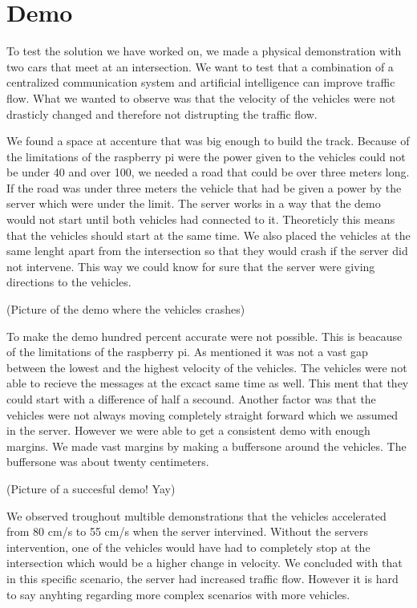 \section{Demo}
To test the solution we have worked on, we made a physical demonstration with two cars that meet at an intersection. We want to test that a combination of a centralized communication system and artificial intelligence can improve traffic flow. What we wanted to observe was that the velocity of the vehicles were not drasticly changed and therefore not distrupting the traffic flow.

We found a space at accenture that was big enough to build the track. Because of the limitations of the raspberry pi were the power given to the vehicles could not be under 40 and over 100, we needed a road that could be over three meters long. If the road was under three meters the vehicle that had be given a power by the server which were under the limit. The server works in a way that the demo would not start until both vehicles had connected to it. Theoreticly this means that the vehicles should start at the same time. We also placed the vehicles at the same lenght apart from the intersection so that they would crash if the server did not intervene. This way we could know for sure that the server were giving directions to the vehicles. 

(Picture of the demo where the vehicles crashes)

To make the demo hundred percent accurate were not possible. This is beacause of the limitations of the raspberry pi. As mentioned it was not a vast gap between the lowest and the highest velocity of the vehicles. The vehicles were not able to recieve the messages at the excact same time as well. This ment that they could start with a difference of half a secound. Another factor was that the vehicles were not always moving completely straight forward which we assumed in the server. However we were able to get a consistent demo with enough margins. We made  vast margins by making a buffersone around the vehicles. The buffersone was about twenty centimeters.

(Picture of a succesful demo! Yay)

We observed troughout multible demonstrations that the vehicles accelerated from 80 cm/s to 55 cm/s when the server intervined. Without the servers intervention, one of the vehicles would have had to completely stop at the intersection which would be a higher change in velocity. We concluded with that in this specific scenario, the server had increased traffic flow. However it is hard to say anyhting regarding more complex scenarios with more vehicles.